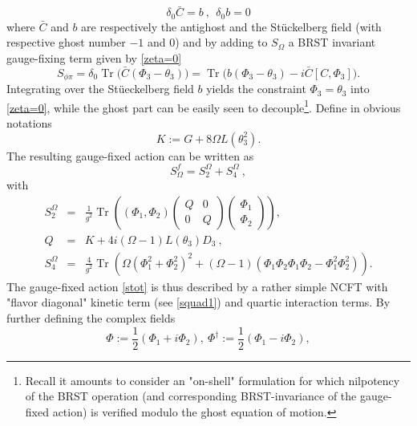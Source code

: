 \documentclass[a4paper,11pt,twoside]{article}
\numberwithin{equation}{section}
\DeclareMathOperator{\tr}{Tr}
\theoremstyle{nonumberplain}
\newcounter{and}
\begin{document}
%
\begin{equation}
\delta_0 {\bar{C}} = b \ , \ \ \delta_0b = 0 \label{contractible-brs}
\end{equation}
%
where ${\bar{C}}$ and $b$ are respectively the antighost and the St\"uckelberg field (with respective ghost number $-1$ and $0$) and by adding to $S_\Omega$ a BRST invariant gauge-fixing term given by \eqref{zeta=0}%
%
\begin{equation}
S_{\phi\pi}=\delta_0\tr\big({\bar{C}}(\Phi_3-\theta_3) \big)=\tr\big(b(\Phi_3-\theta_3)-i{\bar{C}}[C,\Phi_3]\big)\label{gauge-fix}.
\end{equation}
%
Integrating over the St\"ueckelberg field $b$ yields the constraint $\Phi_3=\theta_3$ into \eqref{zeta=0}, while the ghost part can be easily seen to decouple{\footnote{Recall it amounts to consider an "on-shell" formulation for which nilpotency of the BRST operation (and corresponding BRST-invariance of the gauge-fixed action) is verified modulo the ghost equation of motion.}}. Define in obvious notations%
%
\begin{equation}
K:=G+8\Omega L(\theta_3^2)\label{operator-K}.
\end{equation}
%
The resulting gauge-fixed action can be written as%
%
\begin{equation}
S^f_\Omega = S_2^{\Omega} + S_4^{\Omega} \ , \label{stot}
\end{equation}
with%
\begin{eqnarray}
S_2^{\Omega} &=& \frac{1}{g^2} \tr \left((\Phi_1,\Phi_2)
\begin{pmatrix}
Q&0\\
0&Q
\end{pmatrix} 
\begin{pmatrix}
\Phi_1\\
\Phi_2
\end{pmatrix} 
\right) , \nonumber \\
Q &=& K + 4 i (\Omega-1) L(\theta_3) D_3 \ , \label{squad1} \\[5pt]
S_4^{\Omega} &=& \frac{4}{g^2} \tr \left( \Omega (\Phi_1^2 + \Phi_2^2)^2 + (\Omega-1)(\Phi_1\Phi_2\Phi_1\Phi_2 - \Phi_1^2\Phi_2^2) \right) . \label{squart}
\end{eqnarray}
%
The gauge-fixed action \eqref{stot} is thus described by a rather simple NCFT with "flavor diagonal" kinetic term (see \eqref{squad1}) and quartic interaction terms. By further defining the complex fields%
%
\begin{equation}
\Phi:=\frac{1}{2}(\Phi_1+i\Phi_2),\ \Phi^\dag:=\frac{1}{2}(\Phi_1-i\Phi_2),
\end{equation}
\end{document}
